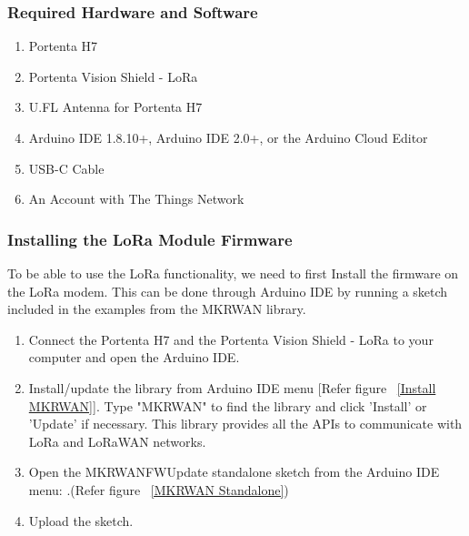 \begin{itemize}

\subsubsection{Required Hardware and Software}

\begin{enumerate}
	\item Portenta H7
	\item Portenta Vision Shield - LoRa
	\item U.FL Antenna for Portenta H7 
	\item Arduino IDE 1.8.10+, Arduino IDE 2.0+, or the Arduino Cloud Editor
	\item USB-C Cable
	\item An Account with The Things Network \cite{ArduinoTTN:2024}
\end{enumerate}


\subsubsection {Installing the LoRa Module Firmware}
To be able to use the LoRa functionality, we need to first Install the firmware on the LoRa modem. This can be done through Arduino IDE by running a sketch included in the examples from the MKRWAN library.

\begin{enumerate}
	\item Connect the Portenta H7 and the Portenta Vision Shield - LoRa to your computer and open the Arduino IDE. 
	\item Install/update the  library from Arduino IDE menu [Refer figure ~\ref{Install MKRWAN}]. Type "MKRWAN" to find the library and click 'Install' or 'Update' if necessary. This library provides all the APIs to communicate with LoRa and LoRaWAN networks.
	\item Open the MKRWANFWUpdate standalone sketch from the Arduino IDE menu: .(Refer figure ~\ref{MKRWAN Standalone})
	\item Upload the sketch. \cite{ArduinoTTN:2024}
\end{enumerate}


\end{itemize}
